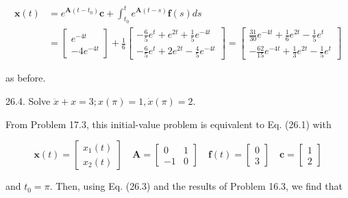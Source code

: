 \documentclass[10pt]{article}
\begin{document}
$$
\begin{aligned}
\mathbf{x}(t) & =e^{\mathbf{A}\left(t-t_{0}\right)} \mathbf{c}+\int_{t_{0}}^{t} e^{\mathbf{A}(t-s)} \mathbf{f}(s) d s \\
& =\left[\begin{array}{c}
e^{-4 t} \\
-4 e^{-4 t}
\end{array}\right]+\frac{1}{6}\left[\begin{array}{c}
-\frac{6}{5} e^{t}+e^{2 t}+\frac{1}{5} e^{-4 t} \\
-\frac{6}{5} e^{t}+2 e^{2 t}-\frac{4}{5} e^{-4 t}
\end{array}\right]=\left[\begin{array}{c}
\frac{31}{30} e^{-4 t}+\frac{1}{6} e^{2 t}-\frac{1}{5} e^{t} \\
-\frac{62}{15} e^{-4 t}+\frac{1}{3} e^{2 t}-\frac{1}{5} e^{t}
\end{array}\right]
\end{aligned}
$$

as before.

26.4. Solve $\ddot{x}+x=3 ; x(\pi)=1, \dot{x}(\pi)=2$.

From Problem 17.3, this initial-value problem is equivalent to Eq. (26.1) with

$$
\mathbf{x}(t)=\left[\begin{array}{l}
x_{1}(t) \\
x_{2}(t)
\end{array}\right] \quad \mathbf{A}=\left[\begin{array}{rr}
0 & 1 \\
-1 & 0
\end{array}\right] \quad \mathbf{f}(t)=\left[\begin{array}{l}
0 \\
3
\end{array}\right] \quad \mathbf{c}=\left[\begin{array}{l}
1 \\
2
\end{array}\right]
$$

and $t_{0}=\pi$. Then, using Eq. (26.3) and the results of Problem 16.3, we find that
\end{document}
